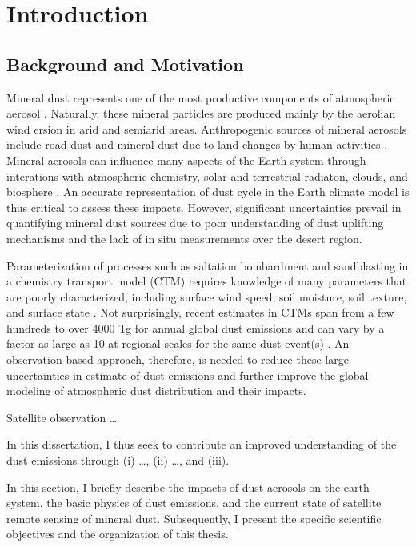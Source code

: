
\chapter{Introduction}

\section{Background and Motivation}

 Mineral dust represents one of the most productive components of atmospheric aerosol 
 \citep{textor06,satheesh05,boucher13}. Naturally, these mineral 
 particles are produced mainly by the aerolian wind ersion in arid and semiarid areas.     
 Anthropogenic sources of mineral aerosols include road dust and mineral dust due to land 
 changes by human activities \citep{tegen96,tegen04,ginoux12}. Mineral aerosols can
 influence many aspects of the Earth system through interations with atmospheric chemistry, 
 solar and terrestrial radiaton, clouds, and biosphere \citep{shao11,ravi11}. 
 An accurate representation of dust cycle in the Earth climate model is thus critical 
 to assess these impacts. However, significant uncertainties prevail in quantifying 
 mineral dust sources due to poor understanding of dust uplifting mechanisms and the 
 lack of in situ measurements over the desert region. 

 Parameterization of processes such as saltation bombardment and sandblasting in a 
 chemistry transport model (CTM) requires knowledge of many parameters that are 
 poorly characterized, including surface wind speed, soil moisture, soil texture, 
 and surface state \citep{tegen94,ginoux01,zender03a}. Not surprisingly, recent 
 estimates in CTMs span from a few hundreds to over 4000 Tg for annual global 
 dust emissions \citep{huneeus11} and can vary by a factor as large as 10 at 
 regional scales for the same dust event(s) \citep{uno06}. An observation-based 
 approach, therefore, is needed to reduce these large uncertainties in estimate of 
 dust emissions and further improve the global modeling of atmospheric dust distribution 
 and their impacts.

 Satellite observation \ldots

 In this dissertation, I thus seek to contribute an improved understanding 
 of the dust emissions through (i) \ldots, (ii) \ldots, and (iii).

 In this section, I briefly describe the impacts of dust aerosols on the earth system, 
 the basic physics of dust emissions, and the current state of satellite remote sensing 
 of mineral dust. Subsequently, I present the specific scientific objectives and the 
 organization of this thesis.  

